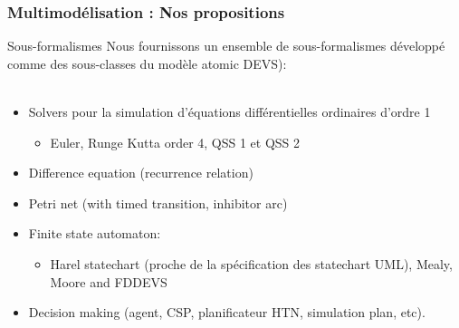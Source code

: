 \documentclass[xetex, compress, table, svgnames]{beamer}
\begin{document}
\begin{frame}
  \frametitle{Multimodélisation : Nos propositions}
  \begin{block}{Sous-formalismes}
    Nous fournissons un ensemble de sous-formalismes développé comme
    des sous-classes du modèle atomic DEVS):\\~\\
    \begin{itemize}
    \item Solvers pour la \alert{simulation d'équations
        différentielles ordinaires d'ordre 1}
      \begin{itemize}
      \item Euler, Runge Kutta order 4, QSS 1 et QSS 2
      \end{itemize}
    \item \alert{Difference equation} (recurrence relation)
    \item \alert{Petri net} (with timed transition, inhibitor arc)
    \item \alert{Finite state automaton}:
      \begin{itemize}
      \item Harel statechart (proche de la spécification des
        statechart UML), Mealy, Moore and FDDEVS
      \end{itemize}
    \item \alert{Decision making} (agent, CSP, planificateur HTN,
      simulation plan, etc).
    \end{itemize}
  \end{block}
\end{frame}
\end{document}
